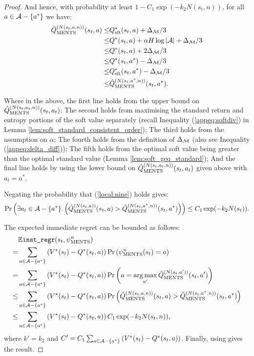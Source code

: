 \begin{proof}
        And hence, with probability at least $1-C_1 \exp(-k_2N(s_t,n))$, for all $a\in\mathcal{A}-\{a^*\}$ we have:
        \begin{align}
            {\hat{Q}^{(N(s_t,a,n))}_{{\textnormal{MENTS}}}}(s_t,a)
                \leq& Q_{{\textnormal{sft}}}^*(s_t,a) + \Delta_{\mathcal{M}}/3 \\
                \leq& Q^*(s_t,a) + \alpha H\log |\mathcal{A}| + \Delta_{\mathcal{M}}/3 \\
                \leq& Q^*(s_t,a) + 2\Delta_{\mathcal{M}}/3 \\
                \leq& Q^*(s_t,a^*) - \Delta_{\mathcal{M}}/3 \\
                \leq& Q_{{\textnormal{sft}}}^*(s_t,a^*) - \Delta_{\mathcal{M}}/3 \\
                \leq& {\hat{Q}^{(N(s_t,a^*,n))}_{{\textnormal{MENTS}}}}(s_t,a^*). \label{local:nine}
        \end{align}
        
        Where in the above, the first line holds from the upper bound on ${\hat{Q}^{(N(s_t,a_t,n))}_{{\textnormal{MENTS}}}}(s_t,a_t)$; The second holds from maximising the standard return and entropy portions of the soft value separately (recall Inequality (\ref{appeq:softdiv}) in Lemma \ref{lem:soft_standard_consistent_order}); The third holds from the assumption on $\alpha$; The fourth holds from the definition of $\Delta_{\mathcal{M}}$ (also see Inequality (\ref{appeq:delta_diff})); The fifth holds from the optimal soft value being greater than the optimal standard value (Lemma \ref{lem:soft_geq_standard}); And the final line holds by using the lower bound on ${\hat{Q}^{(N(s_t,a_t,n))}_{{\textnormal{MENTS}}}}(s_t,a_t)$ given above with $a_t=a^*$. 
        
        Negating the probability that (\ref{local:nine}) holds gives:
        \begin{align}
            \Pr\left(\exists a_t\in\mathcal{A}-\{a^*\}.\left( 
                {\hat{Q}^{(N(s_t,a))}_{{\textnormal{MENTS}}}}(s_t,a) > {\hat{Q}^{(N(s_t,a^*,n))}_{{\textnormal{MENTS}}}}(s_t,a^*)\right)\right)
                \leq C_1 \exp(-k_2N(s_t)).
        \end{align}
        
        The expected immediate regret can be bounded as follows:
        \begin{align}
            & \mathbb{E}{\textnormal{\texttt{inst\_regr}}}(s_t,\psi^{n}_{{\textnormal{MENTS}}})  \\
                =& \sum_{a\in\mathcal{A}-\{a^*\}} 
                    \left(V^*(s_t)-Q^*(s_t,a)\right) \Pr\left(\psi^{n}_{{\textnormal{MENTS}}}(s_t) =a \right) \\
                =& \sum_{a\in\mathcal{A}-\{a^*\}} 
                    \left(V^*(s_t)-Q^*(s_t,a)\right) \Pr\left(a = \operatorname*{arg\,max}_{a'} {\hat{Q}^{(N(s_t,a'))}_{{\textnormal{MENTS}}}}(s_t,a') \right) \\
                \leq& \sum_{a\in\mathcal{A}-\{a^*\}} 
                    \left(V^*(s_t)-Q^*(s_t,a)\right) \Pr\left({\hat{Q}^{(N(s_t,a,n))}_{{\textnormal{MENTS}}}}(s_t,a) > {\hat{Q}^{(N(s_t,a^*,n))}_{{\textnormal{MENTS}}}}(s_t,a^*)  \right) \\
                \leq&  \sum_{a\in\mathcal{A}-\{a^*\}} 
                    \left(V^*(s_t)-Q^*(s_t,a)\right) C_1 \exp(-k_2N(s_t,n)),
        \end{align}
        where $k'=k_2$ and $C'=C_1\sum_{a\in\mathcal{A}-\{a^*\}} \left(V^*(s_t)-Q^*(s_t,a)\right)$. Finally, using  gives the result.
    \end{proof}

